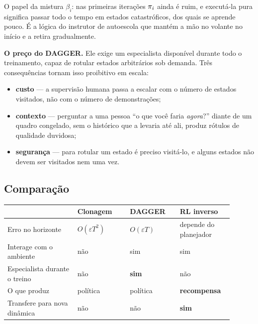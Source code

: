 \documentclass[11pt, a4paper]{article}
\begin{document}
\begin{ideiabox}
O papel da mistura $\beta_i$: nas primeiras iterações $\pi_i$ ainda é ruim, e
executá-la pura significa passar todo o tempo em estados catastróficos, dos
quais se aprende pouco. É a lógica do instrutor de autoescola que mantém a mão
no volante no início e a retira gradualmente.
\end{ideiabox}

\begin{alertabox}
\textbf{O preço do DAGGER.} Ele exige um especialista disponível durante todo o
treinamento, capaz de rotular estados arbitrários sob demanda. Três consequências
tornam isso proibitivo em escala:
\begin{itemize}
  \item \textbf{custo} --- a supervisão humana passa a escalar com o número de
    estados visitados, não com o número de demonstrações;
  \item \textbf{contexto} --- perguntar a uma pessoa ``o que você faria
    \emph{agora}?'' diante de um quadro congelado, sem o histórico que a levaria
    até ali, produz rótulos de qualidade duvidosa;
  \item \textbf{segurança} --- para rotular um estado é preciso visitá-lo, e
    alguns estados não devem ser visitados nem uma vez.
\end{itemize}
\end{alertabox}

\subsection{Comparação}

\begin{center}\small
\begin{tabular}{@{}p{0.28\linewidth}p{0.21\linewidth}p{0.2\linewidth}p{0.21\linewidth}@{}}
\toprule
& \textbf{Clonagem} & \textbf{DAGGER} & \textbf{RL inverso}\\
\midrule
Erro no horizonte & $O(\varepsilon T^2)$ & $O(\varepsilon T)$ & depende do planejador\\
Interage com o ambiente & não & sim & sim\\
Especialista durante o treino & não & \textbf{sim} & não\\
O que produz & política & política & \textbf{recompensa}\\
Transfere para nova dinâmica & não & não & \textbf{sim}\\
\bottomrule
\end{tabular}
\end{center}
\end{document}
